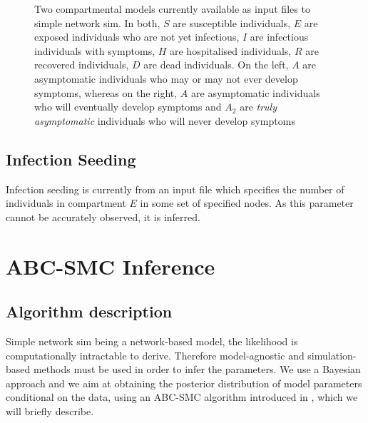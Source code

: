 \documentclass[11pt]{article}
\begin{document}
\begin{figure}[h!]
\caption{Two compartmental models currently available as input files to simple network sim.  In both, $S$ are susceptible individuals, $E$ are exposed individuals who are not yet infectious, $I$ are infectious individuals with symptoms,  $H$ are hospitalised individuals, $R$ are recovered individuals, $D$ are dead individuals. On the left, $A$  are asymptomatic individuals who may or may not ever develop symptoms, whereas on the right, $A$ are asymptomatic individuals who will eventually develop symptoms and \textbf{$A_2$} are \emph{truly asymptomatic} individuals who will never develop symptoms}
\label{fig:compartments}
\end{figure}


\subsection{Infection Seeding}
Infection seeding is currently from an input file which specifies the number of individuals in compartment $E$ in some set of specified nodes. As this parameter cannot be accurately observed, it is inferred.

\section{ABC-SMC Inference}

\subsection{Algorithm description}

Simple network sim being a network-based model, the likelihood is computationally intractable to derive. Therefore model-agnostic and simulation-based methods must be used in order to infer the parameters.  We use a Bayesian approach and we aim at obtaining the posterior distribution of model parameters conditional on the data, using an ABC-SMC algorithm introduced in \cite{ABCSMC}, which we will briefly describe.
\end{document}
